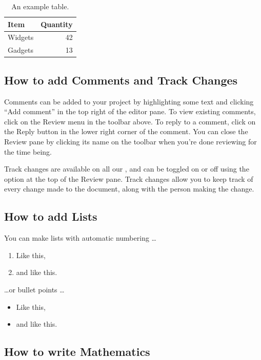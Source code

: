 \begin{table}
    \centering
    \begin{tabular}{l|r}
        Item    & Quantity \\\hline
        Widgets & 42       \\
        Gadgets & 13
    \end{tabular}
    \caption{\label{tab:widgets}An example table.}
\end{table}

\subsection{How to add Comments and Track Changes}

Comments can be added to your project by highlighting some text and clicking ``Add comment'' in the top right of the editor pane. To view existing comments, click on the Review menu in the toolbar above. To reply to a comment, click on the Reply button in the lower right corner of the comment. You can close the Review pane by clicking its name on the toolbar when you're done reviewing for the time being.

Track changes are available on all our , and can be toggled on or off using the option at the top of the Review pane. Track changes allow you to keep track of every change made to the document, along with the person making the change.

\subsection{How to add Lists}

You can make lists with automatic numbering \dots

\begin{enumerate}
    \item Like this,
    \item and like this.
\end{enumerate}
\dots or bullet points \dots
\begin{itemize}
    \item Like this,
    \item and like this.
\end{itemize}

\subsection{How to write Mathematics}

